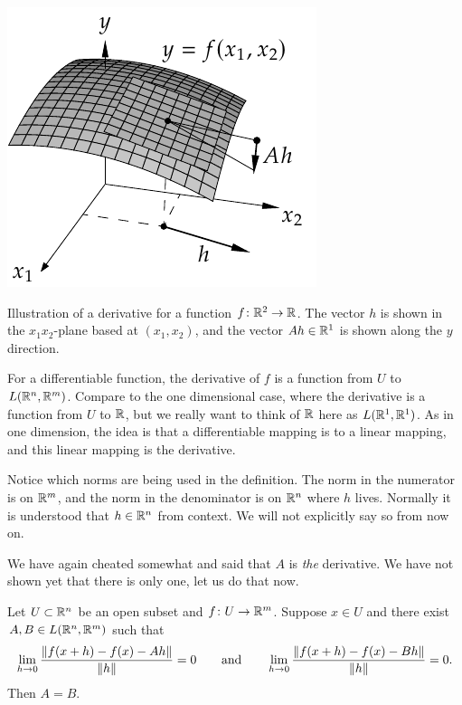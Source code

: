\begin{myfigureht}
\includegraphics{figures/svder}
\caption{Illustration of a derivative for a function $f \colon {\mathbb{R}}^2 \to {\mathbb{R}}$.  The vector $h$ is shown
in the $x_1x_2$-plane based at $(x_1,x_2)$, and the vector
$Ah \in {\mathbb{R}}^1$ is shown along the $y$ direction.\label{fig:svder}}
\end{myfigureht}

For a differentiable function,
the derivative of $f$ is a function from $U$ to $L({\mathbb{R}}^n,{\mathbb{R}}^m)$.  Compare
to the one dimensional case, where the derivative is a function
from $U$ to ${\mathbb{R}}$, but we really want to think of ${\mathbb{R}}$ here as
$L({\mathbb{R}}^1,{\mathbb{R}}^1)$.  As in one dimension, the idea is that a differentiable
mapping is  to a linear mapping, and this
linear mapping is the derivative.

Notice which norms are being used in the definition.
The norm in the
numerator is on ${\mathbb{R}}^m$, and the norm in the denominator is on ${\mathbb{R}}^n$ where $h$
lives.
Normally it is 
understood that $h \in {\mathbb{R}}^n$ from context.
We will not explicitly say so from now on.

We have again cheated somewhat and said that $A$
is \emph{the} derivative.  We have not shown yet that there
is only one, let us do that now.

\begin{prop}
Let $U \subset {\mathbb{R}}^n$ be an open subset and $f \colon U \to {\mathbb{R}}^m$.  Suppose
$x \in U$ and there exist 
$A,B \in L({\mathbb{R}}^n,{\mathbb{R}}^m)$ such that
\begin{equation*}
\lim_{h \to 0}
\frac{\lVert {f(x+h)-f(x) - Ah} \rVert}{\lVert {h} \rVert} = 0
\qquad \text{and} \qquad
\lim_{h \to 0}
\frac{\lVert {f(x+h)-f(x) - Bh} \rVert}{\lVert {h} \rVert} = 0 .
\end{equation*}
Then $A=B$.
\end{prop}

